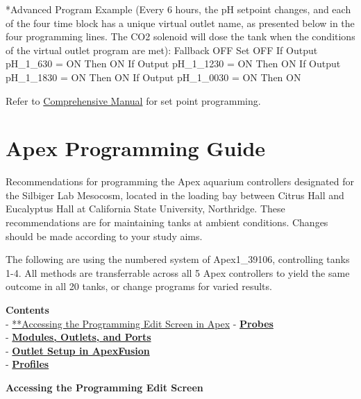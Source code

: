 \documentclass[]{book}
\begin{document}
*Advanced Program Example (Every 6 hours, the pH setpoint changes, and
each of the four time block has a unique virtual outlet name, as
presented below in the four programming lines. The CO2 solenoid will
dose the tank when the conditions of the virtual outlet program are
met): Fallback OFF Set OFF If Output pH\_1\_630 = ON Then ON If Output
pH\_1\_1230 = ON Then ON If Output pH\_1\_1830 = ON Then ON If Output
pH\_1\_0030 = ON Then ON

Refer to
\href{https://github.com/SilbigerLab/Mesocosm_User_Manual/tree/7503b88686aef920c4a4ed473b1efe37b34dae10/Manuals/Apex_Comprehensive_Reference_Manual.pdf}{Comprehensive
Manual} for set point programming.

\chapter{Apex Programming Guide}\label{apex-programming-guide}

Recommendations for programming the Apex aquarium controllers designated
for the Silbiger Lab Mesocosm, located in the loading bay between Citrus
Hall and Eucalyptus Hall at California State University, Northridge.
These recommendations are for maintaining tanks at ambient conditions.
Changes should be made according to your study aims.

The following are using the numbered system of Apex1\_39106, controlling
tanks 1-4. All methods are transferrable across all 5 Apex controllers
to yield the same outcome in all 20 tanks, or change programs for varied
results.

\textbf{Contents}\\
- \protect\hyperlink{Programm_Screen}{**Accessing the Programming Edit
Screen in Apex} - \protect\hyperlink{Probes}{\textbf{Probes}}\\
- \protect\hyperlink{Modules_Outlets_and_Ports}{\textbf{Modules,
Outlets, and Ports}}\\
- \protect\hyperlink{Outlet_Setup}{\textbf{Outlet Setup in
ApexFusion}}\\
- \protect\hyperlink{Profiles}{\textbf{Profiles}}

 \textbf{Accessing the Programming Edit Screen}
\end{document}
